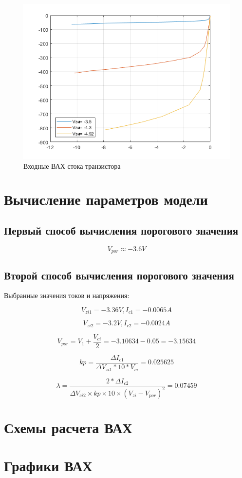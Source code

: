 \documentclass[a4paper,14pt]{article}
\begin{document}
\begin{figure}[H]
	\centering
	\includegraphics[width=0.7\linewidth]{image/graph_2}
	\caption{Входные ВАХ стока транзистора}
	\label{fig:graph2}
\end{figure}

\section{Вычисление параметров модели}

\subsection{Первый способ вычисления порогового значения}

$$V_{por} \approx -3.6V$$


\subsection{Второй способ вычисления порогового значения}

Выбранные значения токов и напряжения:

$$V_{zi1} = -3.36V,	I_{c1} = -0.0065A$$

$$V_{zi2} = -3.2V,	I_{c2} = -0.0024A$$

$$V_{por} = V_1 + \frac{V_{ci}}{2} = -3.10634 - 0.05 = -3.15634$$

$$kp = \frac{\Delta I_{c1}}{\Delta V_{zi1} * 10 * V_{ci}} = 0.025625$$

$$\lambda = \frac{2*\Delta I_{c2}}{\Delta V_{ci2} \times kp \times 10 \times (V_{zi} - V_{por})^2} = 0.07459$$ 

\section{Схемы расчета ВАХ}
\section{Графики ВАХ}
\end{document}
